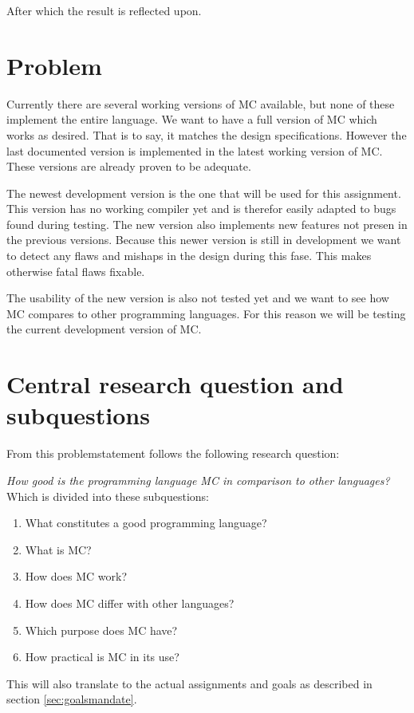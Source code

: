 After which the result is reflected upon.

\section{Problem}
Currently there are several working versions of MC available, but none of these implement the entire language.
We want to have a full version of MC which works as desired.
That is to say, it matches the design specifications.
However the last documented version is implemented in the latest working version of MC.
These versions are already proven to be adequate\cite{giuseppe2015mc}.

The newest development version is the one that will be used for this assignment.
This version has no working compiler yet and is therefor easily adapted to bugs found during testing.
The new version also implements new features not presen in the previous versions.
Because this newer version is still in development we want to detect any flaws and mishaps in the design during this fase.
This makes otherwise fatal flaws fixable.

The usability of the new version is also not tested yet and we want to see how MC compares to other programming languages.
For this reason we will be testing the current development version of MC.

\section{Central research question and subquestions}
From this problemstatement follows the following research question:

\textit{How good is the programming language MC in comparison to other languages?} \newline
Which is divided into these subquestions:
\begin{enumerate}
   \item What constitutes a good programming language?
   \item What is MC?
   \item How does MC work?
   \item How does MC differ with other languages?
   \item Which purpose does MC have?
   \item How practical is MC in its use?
\end{enumerate}

This will also translate to the actual assignments and goals as described in section \ref{sec:goalsmandate}.

